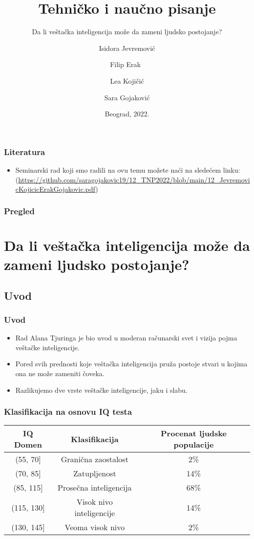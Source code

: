 \documentclass{beamer}
\title{Tehničko i naučno pisanje}
\subtitle{Da li veštačka inteligencija može da zameni ljudsko postojanje?}
\author{Isidora Jevremović \and Filip Erak\ \and Lea Kojičić \and Sara Gojaković}
\institute{Matematički fakultet\\Univerzitet u Beogradu}
\date{
	\footnotesize{Beograd, 2022.}	
}
\begin{document}
\begin{frame}
	\thispagestyle{empty}
	\titlepage
\end{frame}

\addtocounter{framenumber}{-1}

\begin{frame}[fragile]\frametitle{Literatura}
	\begin{itemize}
		\item Seminarski rad koji smo radili na ovu temu možete naći na sledećem linku:
		(\url{https://github.com/saragojakovic19/12_TNP2022/blob/main/12_JevremovicKojicicErakGojakovic.pdf})
	\end{itemize}
\end{frame}

\begin{frame}
	\frametitle{Pregled} %
	\tableofcontents[] 
\end{frame}
\section{Da li veštačka inteligencija može da zameni ljudsko postojanje?}

\subsection{Uvod}

\begin{frame}[fragile]\frametitle{Uvod}
	\begin{itemize}	
		\item Rad Alana Tjuringa je bio uvod u moderan računarski svet i vizija pojma veštačke inteligencije.
		\item Pored svih prednosti koje veštačka inteligencija pruža postoje stvari u kojima ona ne može zameniti čoveka.
       \item Razlikujemo dve vrste veštačke inteligencije, jaku i slabu.
	\end{itemize}
 

 
\end{frame}


\begin{frame}[fragile]\frametitle{Klasifikacija na osnovu IQ testa}
\label{tab:tabelaIQ}
\begin{tabular}{|c|c|c|} \hline
IQ Domen & Klasifikacija & Procenat ljudske populacije\\ \hline
(55, 70]& Granična zaostalost & 2\%\\ \hline
(70, 85] & Zatupljenost & 14\%\\ \hline
(85, 115] & Prosečna inteligencija & 68\%\\ \hline
(115, 130] & Visok nivo inteligencije & 14\%\\ \hline
(130, 145] & Veoma visok nivo & 2\% \\ \hline
\end{tabular}

\end{frame}
\end{document}
